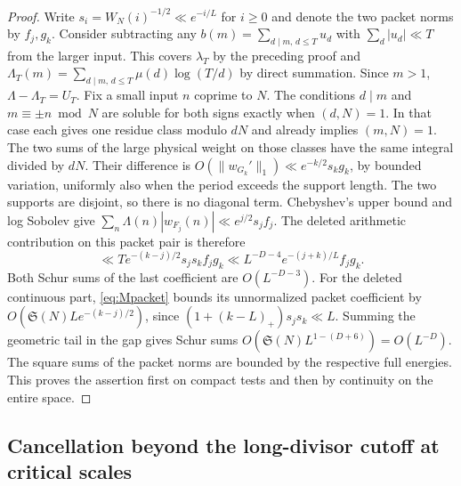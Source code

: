 \documentclass[11pt,a4paper]{article}
\numberwithin{equation}{section}
\newcommand{\SSS}{\mathfrak S}
\begin{document}
\begin{proof}
Write $s_i=W_N(i)^{-1/2}\ll e^{-i/L}$ for $i\ge0$ and denote
the two packet norms by $f_j,g_k$. Consider subtracting any
$b(m)=\sum_{d\mid m,\,d\le T}u_d$ with $\sum_d|u_d|\ll T$
from the larger input. This covers $\lambda_T$ by the preceding
proof and $\Lambda_T(m)=\sum_{d\mid m,\,d\le T}\mu(d)\log(T/d)$
by direct summation. Since $m>1$, $\Lambda-\Lambda_T=U_T$.
Fix a small input $n$ coprime to $N$. The conditions $d\mid m$
and $m\equiv\pm n\bmod N$ are soluble for both signs exactly
when $(d,N)=1$. In that case each gives one residue class
modulo $dN$ and already implies $(m,N)=1$. The two sums of
the large physical weight on those classes have the same
integral divided by $dN$. Their difference is
$O(\|w_{G_k}'\|_1)\ll e^{-k/2}s_k g_k$, by bounded variation,
uniformly also when the period exceeds the support length.
The two supports are disjoint, so there is no diagonal term.
Chebyshev's upper bound and log Sobolev give
$\sum_n\Lambda(n)|w_{F_j}(n)|\ll e^{j/2}s_j f_j$. The deleted
arithmetic contribution on this packet pair is therefore
\[
 \ll T e^{-(k-j)/2}s_js_k f_jg_k
 \ll L^{-D-4} e^{-(j+k)/L} f_jg_k .
\]
Both Schur sums of the last coefficient are $O(L^{-D-3})$.
For the deleted continuous part, \eqref{eq:Mpacket} bounds
its unnormalized packet coefficient by
$O(\SSS(N)L e^{-(k-j)/2})$, since
$(1+(k-L)_+)s_js_k\ll L$. Summing the geometric tail in the
gap gives Schur sums $O(\SSS(N)L^{1-(D+6)})=O(L^{-D})$.
The square sums of the packet norms are bounded by the
respective full energies. This proves the assertion first on
compact tests and then by continuity on the entire space.
\end{proof}

\subsection{Cancellation beyond the long-divisor cutoff at critical scales}
\end{document}
